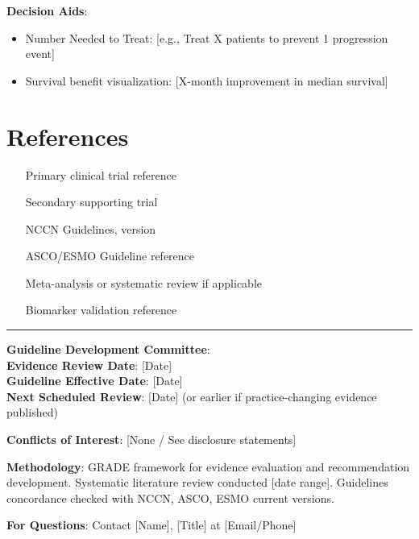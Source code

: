 \documentclass[10pt,letterpaper]{article}
\begin{document}
\textbf{Decision Aids}:
\begin{itemize}
\item Number Needed to Treat: [e.g., Treat X patients to prevent 1 progression event]
\item Survival benefit visualization: [X-month improvement in median survival]
\end{itemize}

\section{References}

\begin{enumerate}
\item [Primary clinical trial reference]
\item [Secondary supporting trial]
\item [NCCN Guidelines, version]
\item [ASCO/ESMO Guideline reference]
\item [Meta-analysis or systematic review if applicable]
\item [Biomarker validation reference]
\end{enumerate}

\vspace{10pt}

\hrule
\vspace{4pt}
{\footnotesize
\textbf{Guideline Development Committee}:\\
[Names and titles of committee members, affiliations]

\textbf{Evidence Review Date}: [Date]\\
\textbf{Guideline Effective Date}: [Date]\\
\textbf{Next Scheduled Review}: [Date] (or earlier if practice-changing evidence published)

\textbf{Conflicts of Interest}: [None / See disclosure statements]

\textbf{Methodology}: GRADE framework for evidence evaluation and recommendation development. Systematic literature review conducted [date range]. Guidelines concordance checked with NCCN, ASCO, ESMO current versions.

\textbf{For Questions}: Contact [Name], [Title] at [Email/Phone]
}
\end{document}
